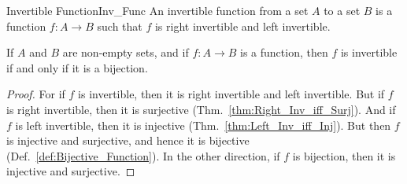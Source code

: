         \begin{fdefinition}{Invertible Function}{Inv_Func}
            An invertible function from a set $A$ to a set $B$ is a function
            $f:A\rightarrow{B}$ such that $f$ is right invertible and left
            invertible.
        \end{fdefinition}
        \begin{theorem}
            If $A$ and $B$ are non-empty sets, and if $f:A\rightarrow{B}$ is a
            function, then $f$ is invertible if and only if it is a bijection.
        \end{theorem}
        \begin{proof}
            For if $f$ is invertible, then it is right invertible and left
            invertible. But if $f$ is right invertible, then it is surjective
            (Thm.~\ref{thm:Right_Inv_iff_Surj}). And if $f$ is left invertible,
            then it is injective (Thm.~\ref{thm:Left_Inv_iff_Inj}). But then
            $f$ is injective and surjective, and hence it is bijective
            (Def.~\ref{def:Bijective_Function}). In the other direction, if $f$
            is bijection, then it is injective and surjective.
        \end{proof}